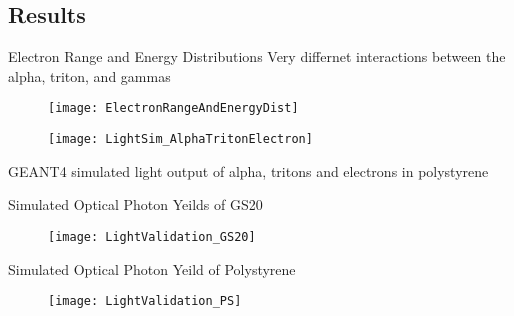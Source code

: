 \subsection{Results}
\begin{frame}{Electron Range and Energy Distributions}
  Very differnet interactions between the alpha, triton, and gammas
  \begin{figure}
    \centering
    \texttt{[image: ElectronRangeAndEnergyDist]}
  \end{figure}
\end{frame}
\begin{frame}
  \begin{figure}
    \centering
    \texttt{[image: LightSim\_AlphaTritonElectron]}
  \end{figure}
  GEANT4 simulated light output of alpha, tritons and electrons in polystyrene
\end{frame}
\begin{frame}{Simulated Optical Photon Yeilds of GS20}
  \begin{figure}
    \centering
    \texttt{[image: LightValidation\_GS20]}
  \end{figure}
\end{frame}
\begin{frame}{Simulated Optical Photon Yeild of Polystyrene}
  \begin{figure}
    \centering
    \texttt{[image: LightValidation\_PS]}
  \end{figure}
  \vspace{2.5cm}
\end{frame}
